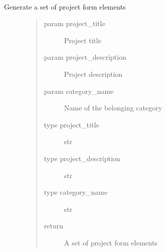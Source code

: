 \documentclass[letterpaper,10pt,english]{sphinxmanual}
\begin{document}

\begin{fulllineitems}
\label{\detokenize{index:views.forms.get_project_form_elements}}~\begin{description}
\item[{Generate a set of project form elements}] \leavevmode\begin{quote}\begin{description}
\item[{param project\_title}] \leavevmode
Project title

\item[{param project\_description}] \leavevmode
Project description

\item[{param category\_name}] \leavevmode
Name of the belonging category

\item[{type project\_title}] \leavevmode
str

\item[{type project\_description}] \leavevmode
str

\item[{type category\_name}] \leavevmode
str

\item[{return}] \leavevmode
A set of project form elements

\end{description}\end{quote}

\end{description}

\end{fulllineitems}

\end{document}
